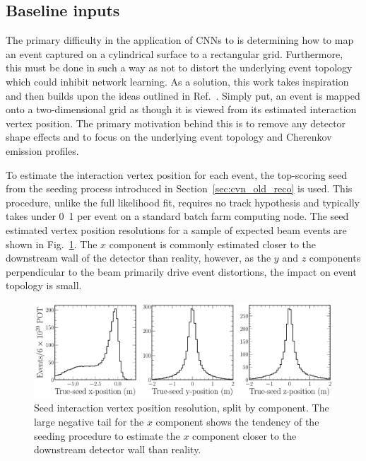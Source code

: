 \subsection{Baseline inputs} %
\label{sec:cvn_baseline_inputs} %

The primary difficulty in the application of CNNs to \chips is determining how to map an event
captured on a cylindrical surface to a rectangular grid. Furthermore, this must be done in such a
way as not to distort the underlying event topology which could inhibit network learning. As a
solution, this work takes inspiration and then builds upon the ideas outlined in
Ref.~\cite{theodore2016}. Simply put, an event is mapped onto a two-dimensional grid as though it
is viewed from its estimated interaction vertex position. The primary motivation behind this is to
remove any detector shape effects and to focus on the underlying event topology and Cherenkov
emission profiles.

To estimate the interaction vertex position for each event, the top-scoring seed from the seeding
process introduced in Section~\ref{sec:cvn_old_reco} is used. This procedure, unlike the full
likelihood fit, requires no track hypothesis and typically takes under
\unit{0.1}{} per event on a standard batch farm computing node. The seed estimated
vertex position resolutions for a sample of expected beam events are shown in
Fig.~\ref{fig:explore_true_reco_vtx}. The $x$ component is commonly estimated closer to the
downstream wall of the detector than reality, however, as the $y$ and $z$ components perpendicular
to the beam primarily drive event distortions, the impact on event topology is small.

\begin{figure} %
    \includegraphics[width=\textwidth]{diagrams/6-cvn/chipsnet/explore_true_reco_vtx.pdf}
    \caption[Seed interaction vertex resolutions.]
    {Seed interaction vertex position resolution, split by component. The large negative tail for
        the $x$ component shows the tendency of the seeding procedure to estimate the $x$
        component closer to the downstream detector wall than reality.}
    \label{fig:explore_true_reco_vtx}
\end{figure}

